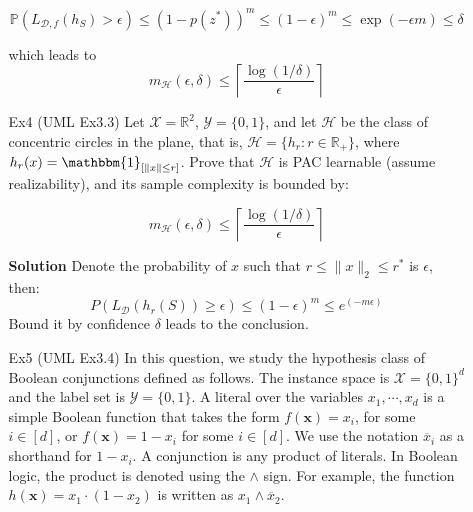 \documentclass{article}
\begin{document}
\begin{itemize}
\begin{itemize}
	\begin{equation*}
	\mathbb{P}(L_{\mathcal{D},f}(h_S)>\epsilon)\leq(1-p(z^*))^m\leq(1-\epsilon)^m\leq\exp(-\epsilon m)\leq\delta
	\end{equation*}

which leads to
	\begin{equation*}
	m_\mathcal{H}(\epsilon,\delta)\leq\left\lceil\frac{\log(1/\delta)}{\epsilon}\right\rceil
	\end{equation*}
	

\item[Ex4] (UML Ex3.3) Let $\mathcal{X}=\mathbb{R}^2$, $\mathcal{Y}=\{0,1\}$, and let $\mathcal{H}$ be the class of concentric circles in the plane, that is, $\mathcal{H}=\{h_r:r\in\mathbb{R}_+\}$, where $h_r(x)=\mathbbm{1}_{[\| x\|\leq r]}$. Prove that $\mathcal{H}$ is PAC learnable (assume realizability), and its sample complexity is bounded by:

	\begin{equation*}
	m_\mathcal{H}(\epsilon,\delta)\leq\left\lceil\frac{\log(1/\delta)}{\epsilon}\right\rceil
	\end{equation*}
	
	\item[] \textbf{Solution} Denote the probability of $x$ such that $r\leq\|x\|_2\leq r^*$ is $\epsilon$, then:
	\begin{equation*}
	P(L_\mathcal{D}(h_r(S))\geq\epsilon) \leq (1-\epsilon)^m \leq e^(-m\epsilon)
	\end{equation*}
Bound it by confidence $\delta$ leads to the conclusion.
	
\item[Ex5] (UML Ex3.4) In this question, we study the hypothesis class of Boolean conjunctions defined as follows. The instance space is $\mathcal{X} = \{0, 1\}^d$ and the label set is $\mathcal{Y} = \{0, 1\}$. A literal over the variables $x_1, \cdots, x_d$ is a simple Boolean function that takes the form $f(\mathbf{x}) = x_i$, for some $i\in [d]$, or $f(\mathbf{x}) = 1-x_i$ for some $i\in [d]$. We use the notation $\overline{x}_i$ as a shorthand for $1-x_i$. A conjunction is any product of literals. In Boolean logic, the product is denoted using the $\wedge$ sign. For example, the function $h(\mathbf{x}) = x_1 \cdot (1 - x_2)$ is written as $x_1 \wedge \overline{x}_2$.


\end{itemize}
\end{itemize}
\end{document}
